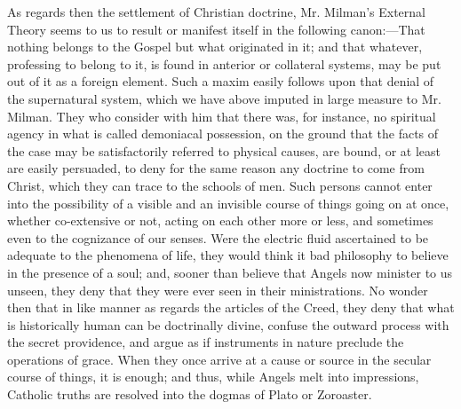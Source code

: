 As regards then the settlement of Christian
doctrine, Mr. Milman's External Theory seems to us to result or
manifest itself in the following canon:—That nothing belongs to the
Gospel but what originated in it; and that whatever, professing to
belong to it, is found in anterior or collateral systems, may be put
out of it as a foreign element. Such a maxim easily follows upon that
denial of the supernatural system, which we have above imputed in
large measure to Mr. Milman. They who consider with him that there
was, for instance, no spiritual agency in what is called demoniacal
possession, on the ground that the facts of the case may be
satisfactorily referred to physical causes, are bound, or at least are
easily persuaded, to deny for the same reason any doctrine to come
from Christ, which they can trace to the schools of men. Such persons
cannot enter into the possibility of a visible and an invisible course
of things going on at once, whether co-extensive or not, acting on
each other more or less, and sometimes even to the cognizance of our
senses. Were the electric fluid ascertained to be adequate to the
phenomena of life, they would think it bad philosophy to believe in
the presence of a soul; and, sooner than believe that Angels now
minister to us unseen, they deny that they were ever seen in their
ministrations. No wonder then that in like manner as regards the
articles of the Creed, they deny that what is historically human can
be doctrinally divine, confuse the outward process with the secret
providence, and argue as if instruments in nature preclude the
operations of grace. When they once arrive at a cause or source in the
secular course of things, it is enough; and thus, while Angels melt
into impressions, Catholic truths are resolved into the dogmas of
Plato or Zoroaster.

